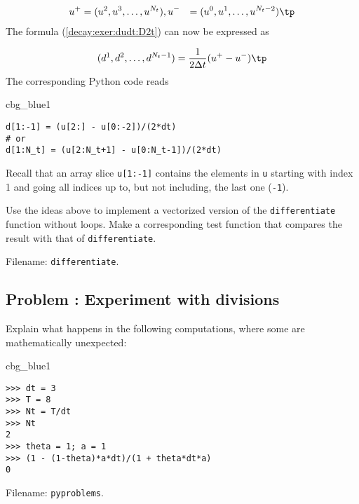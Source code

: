 \documentclass[graybox,sectrefs,envcountresetchap,open=right,final]{svmonodo}
\newenvironment{_cod_tight}[1]{
   \def\FrameCommand{\colorbox{#1}}
   \FrameRule0.6pt\MakeFramed {\FrameRestore}\vskip3mm}
   {\vskip0mm\endMakeFramed}
\newenvironment{cod}[1]{
\bgroup\rmfamily
\fboxsep=0mm\relax
\begin{_cod_tight}{#1}
\list{}{\parsep=-2mm\parskip=0mm\topsep=0pt\leftmargin=2mm
\rightmargin=2\leftmargin\leftmargin=4pt\relax}
\item\relax}
{\endlist\end{_cod_tight}\egroup}
\newenvironment{doconceexercise}{}{}
\newcounter{doconceexercisecounter}
\begin{document}
\begin{doconceexercise}
\begin{align*}
u^+ &= (u^2,u^3,\ldots,u^{N_t}),
u^- &= (u^0,u^1,\ldots,u^{N_t-2})\tp
\end{align*}
The formula (\ref{decay:exer:dudt:D2t}) can now be expressed as

\[ (d^1,d^2,\ldots,d^{N_t-1}) = \frac{1}{2\Delta t}(u^+ - u^-)\tp\]
The corresponding Python code reads

\begin{cod}{cbg_blue1}\begin{Verbatim}[numbers=none,fontsize=\fontsize{9pt}{9pt},baselinestretch=0.95,xleftmargin=2mm]
d[1:-1] = (u[2:] - u[0:-2])/(2*dt)
# or
d[1:N_t] = (u[2:N_t+1] - u[0:N_t-1])/(2*dt)
\end{Verbatim}
\end{cod}
\noindent
Recall that an array slice \texttt{u[1:-1]} contains the elements in \texttt{u} starting
with index 1 and going all indices up to, but not including, the last one
(\texttt{-1}).

Use the ideas above to implement a vectorized version of the
\texttt{differentiate} function without loops. Make a corresponding
test function that compares the result with that of
\texttt{differentiate}.



\noindent Filename: \texttt{differentiate}.

\end{doconceexercise}




\begin{doconceexercise}

\subsection*{Problem \thedoconceexercisecounter: Experiment with divisions}

\label{decay:exer:intdiv}

Explain what happens in the following computations, where
some are mathematically unexpected:

\begin{cod}{cbg_blue1}\begin{Verbatim}[numbers=none,fontsize=\fontsize{9pt}{9pt},baselinestretch=0.95,xleftmargin=2mm]
>>> dt = 3
>>> T = 8
>>> Nt = T/dt
>>> Nt
2
>>> theta = 1; a = 1
>>> (1 - (1-theta)*a*dt)/(1 + theta*dt*a)
0
\end{Verbatim}
\end{cod}
\noindent


\noindent Filename: \texttt{pyproblems}.

\end{doconceexercise}
\end{document}
